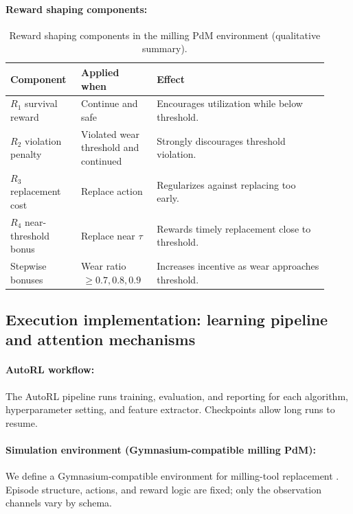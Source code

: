 \documentclass[sn-basic]{sn-jnl}%
\begin{document}
\paragraph{Reward shaping components:}
\begin{table}[htbp]
	\centering
	\caption{Reward shaping components in the milling PdM environment (qualitative summary).}
	\label{tab:reward_components}
	\begin{tabular}{L{0.20\linewidth} L{0.22\linewidth} L{0.50\linewidth}}
		\toprule
		\textbf{Component} & \textbf{Applied when} & \textbf{Effect}\\
		\midrule
		$R_1$ survival reward & Continue and safe & Encourages utilization while below threshold.\\
		$R_2$ violation penalty & Violated wear threshold and continued & Strongly discourages threshold violation.\\
		$R_3$ replacement cost & Replace action & Regularizes against replacing too early.\\
		$R_4$ near-threshold bonus & Replace near $\tau$ & Rewards timely replacement close to threshold.\\
		Stepwise bonuses & Wear ratio $\,\ge 0.7, 0.8, 0.9$ & Increases incentive as wear approaches threshold.\\
		\bottomrule
	\end{tabular}
\end{table}

\subsection{Execution implementation: learning pipeline and attention mechanisms}\label{sec:algo_desc}
\paragraph{AutoRL workflow:}\label{sec:autorl}
The AutoRL pipeline runs training, evaluation, and reporting for each algorithm, hyperparameter setting, and feature extractor. Checkpoints allow long runs to resume.

\paragraph{Simulation environment (Gymnasium-compatible milling PdM):}
We define a Gymnasium-compatible environment for milling-tool replacement \cite{Foundation2023}. Episode structure, actions, and reward logic are fixed; only the observation channels vary by schema.
\end{document}
